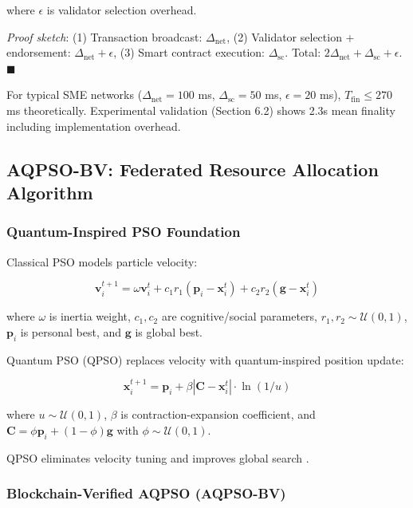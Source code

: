 \documentclass[times,10pt,twocolumn]{jucs2e}
\providecommand{\qed}{\hfill $\blacksquare$}
\begin{document}
where $\epsilon$ is validator selection overhead.

\textit{Proof sketch}: (1) Transaction broadcast: $\Delta_{\text{net}}$, (2) Validator selection + endorsement: $\Delta_{\text{net}} + \epsilon$, (3) Smart contract execution: $\Delta_{\text{sc}}$. Total: $2\Delta_{\text{net}} + \Delta_{\text{sc}} + \epsilon$. \qed

For typical SME networks ($\Delta_{\text{net}} = 100$ ms, $\Delta_{\text{sc}} = 50$ ms, $\epsilon = 20$ ms), $T_{\text{fin}} \leq 270$ ms theoretically. Experimental validation (Section 6.2) shows 2.3s mean finality including implementation overhead.

\subsection{AQPSO-BV: Federated Resource Allocation Algorithm}

\subsubsection{Quantum-Inspired PSO Foundation}

Classical PSO \cite{Kennedy1995} models particle velocity:

\begin{equation}
\mathbf{v}_i^{t+1} = \omega \mathbf{v}_i^t + c_1 r_1 (\mathbf{p}_i - \mathbf{x}_i^t) + c_2 r_2 (\mathbf{g} - \mathbf{x}_i^t)
\end{equation}

where $\omega$ is inertia weight, $c_1, c_2$ are cognitive/social parameters, $r_1, r_2 \sim \mathcal{U}(0,1)$, $\mathbf{p}_i$ is personal best, and $\mathbf{g}$ is global best.

Quantum PSO (QPSO) \cite{Sun2004} replaces velocity with quantum-inspired position update:

\begin{equation}
\mathbf{x}_i^{t+1} = \mathbf{p}_i + \beta |\mathbf{C} - \mathbf{x}_i^t| \cdot \ln(1/u)
\end{equation}

where $u \sim \mathcal{U}(0,1)$, $\beta$ is contraction-expansion coefficient, and $\mathbf{C} = \phi \mathbf{p}_i + (1-\phi) \mathbf{g}$ with $\phi \sim \mathcal{U}(0,1)$.

QPSO eliminates velocity tuning and improves global search \cite{Sun2012}.

\subsubsection{Blockchain-Verified AQPSO (AQPSO-BV)}
\end{document}
